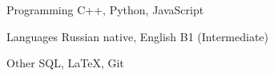 

\begin{cvskills}

%


  \cvskill
    {Programming} %
    {C++, Python, JavaScript} %

  \cvskill
    {Languages} %
    {Russian native, English B1 (Intermediate)} %

\cvskill
    {Other} %
    {SQL, LaTeX, Git} %

\end{cvskills}
